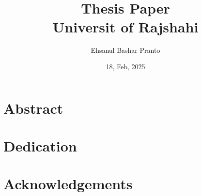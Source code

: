 \documentclass[a4paper, 11pt]{report}
\title{Thesis Paper\\ 
{\Large{Universit of Rajshahi}}}
\author{Ehsanul Bashar Pranto}
\date{18, Feb, 2025}
\begin{document}
\maketitle

\chapter*{Abstract}
\lipsum[1-5]

\twocolumn
\chapter*{Dedication}
\lipsum[1-5]

\onecolumn
\chapter*{Acknowledgements}
\lipsum[1-5]


\tableofcontents

\listoffigures










\appendix




\end{document}
